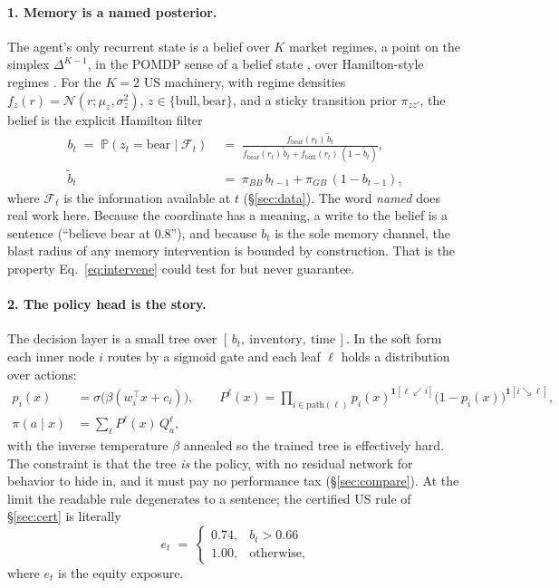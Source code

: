 \documentclass[11pt]{article}
\newcommand{\Prob}{\mathbb{P}}
\newcommand{\ind}{\mathbf{1}}
\begin{document}
\paragraph{1. Memory is a named posterior.} The agent's only recurrent state is a belief over
$K$ market regimes, a point on the simplex $\Delta^{K-1}$, in the POMDP sense of a belief
state \citep{kaelbling1998}, over Hamilton-style regimes \citep{hamilton1989}. For the $K{=}2$
US machinery, with regime densities $f_z(r) = \mathcal{N}(r;\mu_z,\sigma_z^2)$,
$z\in\{\text{bull},\text{bear}\}$, and a sticky transition prior $\pi_{zz'}$, the belief is the
explicit Hamilton filter
\begin{align}
b_t \;=\; \Prob(z_t = \text{bear}\mid \mathcal{F}_t)
\;&=\; \frac{f_{\text{bear}}(r_t)\,\tilde b_t}
{f_{\text{bear}}(r_t)\,\tilde b_t + f_{\text{bull}}(r_t)\,(1-\tilde b_t)},
\label{eq:belief}\\
\tilde b_t \;&=\; \pi_{BB}\, b_{t-1} + \pi_{GB}\,(1-b_{t-1}),\nonumber
\end{align}
where $\mathcal{F}_t$ is the information available at $t$ (\S\ref{sec:data}). The word
\emph{named} does real work here. Because the coordinate has a meaning, a write to the belief is a
sentence (``believe bear at $0.8$''), and because $b_t$ is the sole memory channel, the blast
radius of any memory intervention is bounded by construction. That is the property
Eq.~\ref{eq:intervene} could test for but never guarantee.

\paragraph{2. The policy head is the story.} The decision layer is a small tree over
$[\,b_t,\ \text{inventory},\ \text{time}\,]$. In the soft form \citep{frosst2017} each inner
node $i$ routes by a sigmoid gate and each leaf $\ell$ holds a distribution over actions:
\begin{align}
p_i(x) &= \sigma\!\big(\beta(w_i^{\top}x + c_i)\big), \qquad
P^{\ell}(x) = \prod_{i \in \text{path}(\ell)} p_i(x)^{\ind[\ell \swarrow i]}
\big(1-p_i(x)\big)^{\ind[i \searrow \ell]},
\label{eq:tree}\\
\pi(a\mid x) &= \sum_{\ell} P^{\ell}(x)\, Q^{\ell}_a ,\nonumber
\end{align}
with the inverse temperature $\beta$ annealed so the trained tree is effectively hard. The
constraint is that the tree \emph{is} the policy, with no residual network for behavior to hide
in, and it must pay no performance tax (\S\ref{sec:compare}). At the limit the readable rule
degenerates to a sentence; the certified US rule of \S\ref{sec:cert} is literally
\begin{equation}
e_t \;=\; \begin{cases} 0.74, & b_t > 0.66\\[2pt] 1.00, & \text{otherwise,}\end{cases}
\label{eq:rule}
\end{equation}
where $e_t$ is the equity exposure.
\end{document}
